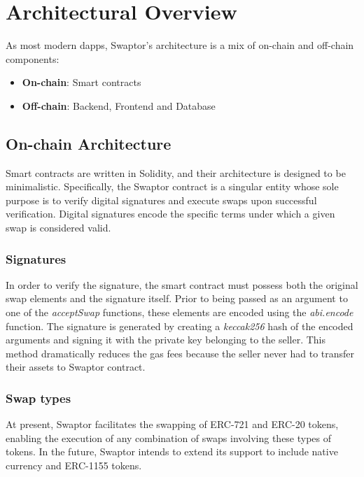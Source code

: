 \documentclass[12pt]{article}
\begin{document}
\section{Architectural Overview} \label{form}
\indent As most modern dapps, Swaptor's architecture is a mix of on-chain and off-chain components:
\begin{itemize}
  \item \textbf{On-chain}: Smart contracts
  \item \textbf{Off-chain}: Backend, Frontend and Database
\end{itemize}

\subsection{On-chain Architecture}

\indent Smart contracts are written in Solidity, and their architecture is designed to be minimalistic.
Specifically, the Swaptor contract is a singular entity whose sole purpose is to verify digital signatures
and execute swaps upon successful verification. Digital signatures encode the specific terms under which a given swap is considered valid.

\subsubsection{Signatures}

In order to verify the signature, the smart contract must possess both the original swap elements
and the signature itself. Prior to being passed as an argument to one of the \textit{acceptSwap} functions,
these elements are encoded using the \textit{abi.encode} function. The signature is generated by creating a
\textit{keccak256} hash of the encoded arguments and signing it with the private key belonging to the seller.
This method dramatically reduces the gas fees because the seller never had to transfer their assets to Swaptor contract.

\subsubsection{Swap types}

At present, Swaptor facilitates the swapping of ERC-721 and ERC-20 tokens, enabling the execution of any combination of swaps involving these types of tokens.
In the future, Swaptor intends to extend its support to include native currency and ERC-1155 tokens.
\end{document}
